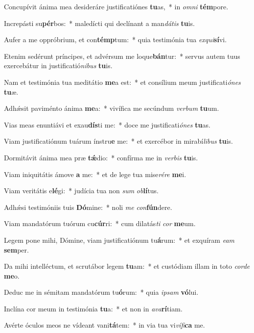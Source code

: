 \item Concupívit ánima mea desideráre justificatiónes \textbf{tu}as,~* in \textit{om}\textit{ni} \textbf{tém}pore.
\item Increpásti su\textbf{pér}bos:~* maledícti qui declínant a man\textit{dá}\textit{tis} \textbf{tu}is.
\item Aufer a me oppróbrium, et con\textbf{témp}tum:~* quia testimónia tua \textit{ex}\textit{qui}\textbf{sí}vi.
\item Etenim sedérunt príncipes, et advérsum me loque\textbf{bán}tur:~* servus autem tuus exercebátur in justificatió\textit{ni}\textit{bus} \textbf{tu}is.
\item Nam et testimónia tua meditátio \textbf{me}a est:~* et consílium meum justificati\textit{ó}\textit{nes} \textbf{tu}æ.
\item Adhǽsit paviménto ánima \textbf{me}a:~* vivífica me secúndum \textit{ver}\textit{bum} \textbf{tu}um.
\item Vias meas enuntiávi et exau\textbf{dís}ti me:~* doce me justificati\textit{ó}\textit{nes} \textbf{tu}as.
\item Viam justificatiónum tuárum ínstru\textbf{e} me:~* et exercébor in mirabí\textit{li}\textit{bus} \textbf{tu}is.
\item Dormitávit ánima mea præ \textbf{tǽ}dio:~* confírma me in \textit{ver}\textit{bis} \textbf{tu}is.
\item Viam iniquitátis ámove \textbf{a} me:~* et de lege tua mise\textit{ré}\textit{re} \textbf{me}i.
\item Viam veritátis e\textbf{lé}gi:~* judícia tua non \textit{sum} \textit{ob}\textbf{lí}tus.
\item Adhǽsi testimóniis tuis \textbf{Dó}mine:~* noli \textit{me} \textit{con}\textbf{fún}dere.
\item Viam mandatórum tuórum cu\textbf{cúr}ri:~* cum dilatás\textit{ti} \textit{cor} \textbf{me}um.
\item Legem pone mihi, Dómine, viam justificatiónum tu\textbf{á}rum:~* et exquíram \textit{e}\textit{am} \textbf{sem}per.
\item Da mihi intelléctum, et scrutábor legem \textbf{tu}am:~* et custódiam illam in toto \textit{cor}\textit{de} \textbf{me}o.
\item Deduc me in sémitam mandatórum tu\textbf{ó}rum:~* quia \textit{ip}\textit{sam} \textbf{vó}lui.
\item Inclína cor meum in testimónia \textbf{tu}a:~* et non in \textit{a}\textit{va}\textbf{rí}tiam.
\item Avérte óculos meos ne vídeant vani\textbf{tá}tem:~* in via tua vi\textit{ví}\textit{fi}\textbf{ca} me.
